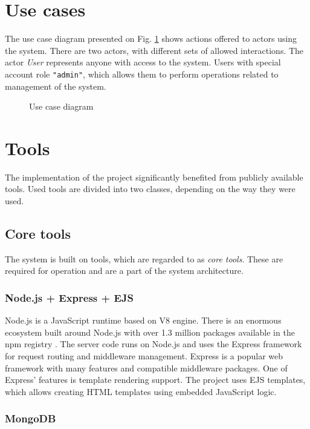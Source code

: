 \section{Use cases}

The use case diagram presented on Fig. \ref{fig:use-case-diag} shows actions offered to actors using the system. There are two actors, with different sets of allowed interactions. The actor \textit{User} represents anyone with access to the system. Users with special account role \texttt{"admin"}, which allows them to perform operations related to management of the system.

\begin{figure}
	\centering
	
	\caption{Use case diagram}
	\label{fig:use-case-diag}
\end{figure}

\section{Tools}

The implementation of the project significantly benefited from publicly available tools. Used tools are divided into two classes, depending on the way they were used.

\subsection{Core tools}

The system is built on tools, which are regarded to as \textit{core tools}. These are required for operation and are a part of the system architecture.

\subsubsection{Node.js + Express + EJS}

Node.js is a JavaScript runtime based on V8 engine. There is an enormous ecosystem built around Node.js with over 1.3 million packages available in the npm registry \cite{bib:npm-packages}. The server code runs on Node.js and uses the Express framework for request routing and middleware management. Express is a popular web framework with many features and compatible middleware packages. One of Express' features is template rendering support. The project uses EJS templates, which allows creating HTML templates using embedded JavaScript logic.

\subsubsection{MongoDB}

